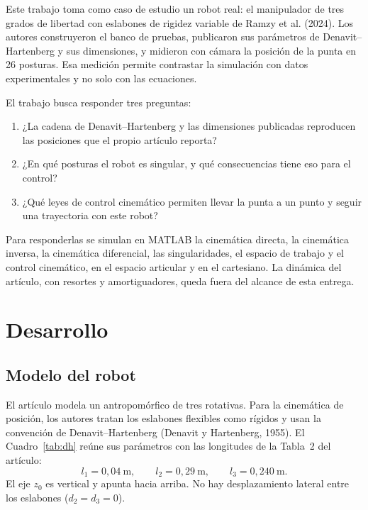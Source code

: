 \documentclass[11pt,a4paper]{article}
\begin{document}
Este trabajo toma como caso de estudio un robot real: el manipulador de tres grados de libertad con eslabones de rigidez variable de Ramzy et al. (2024). Los autores construyeron el banco de pruebas, publicaron sus parámetros de Denavit--Hartenberg y sus dimensiones, y midieron con cámara la posición de la punta en 26 posturas. Esa medición permite contrastar la simulación con datos experimentales y no solo con las ecuaciones.

El trabajo busca responder tres preguntas:
\begin{enumerate}
\item ¿La cadena de Denavit--Hartenberg y las dimensiones publicadas reproducen las posiciones que el propio artículo reporta?
\item ¿En qué posturas el robot es singular, y qué consecuencias tiene eso para el control?
\item ¿Qué leyes de control cinemático permiten llevar la punta a un punto y seguir una trayectoria con este robot?
\end{enumerate}

Para responderlas se simulan en MATLAB la cinemática directa, la cinemática inversa, la cinemática diferencial, las singularidades, el espacio de trabajo y el control cinemático, en el espacio articular y en el cartesiano. La dinámica del artículo, con resortes y amortiguadores, queda fuera del alcance de esta entrega.

\section{Desarrollo}

\subsection{Modelo del robot}

El artículo modela un antropomórfico de tres rotativas. Para la cinemática de posición, los autores tratan los eslabones flexibles como rígidos y usan la convención de Denavit--Hartenberg (Denavit y Hartenberg, 1955). El Cuadro~\ref{tab:dh} reúne sus parámetros con las longitudes de la Tabla~2 del artículo:
\begin{equation}
l_1=0{,}04~\mathrm{m},\qquad l_2=0{,}29~\mathrm{m},\qquad l_3=0{,}240~\mathrm{m}.
\end{equation}
El eje \(z_0\) es vertical y apunta hacia arriba. No hay desplazamiento lateral entre los eslabones (\(d_2=d_3=0\)).
\end{document}
